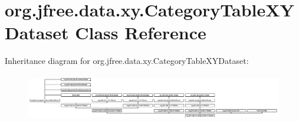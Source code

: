 \hypertarget{classorg_1_1jfree_1_1data_1_1xy_1_1_category_table_x_y_dataset}{}\section{org.\+jfree.\+data.\+xy.\+Category\+Table\+X\+Y\+Dataset Class Reference}
\label{classorg_1_1jfree_1_1data_1_1xy_1_1_category_table_x_y_dataset}
Inheritance diagram for org.\+jfree.\+data.\+xy.\+Category\+Table\+X\+Y\+Dataset\+:\begin{figure}[H]
\begin{center}
\leavevmode
\includegraphics[height=2.051282cm]{classorg_1_1jfree_1_1data_1_1xy_1_1_category_table_x_y_dataset}
\end{center}
\end{figure}
